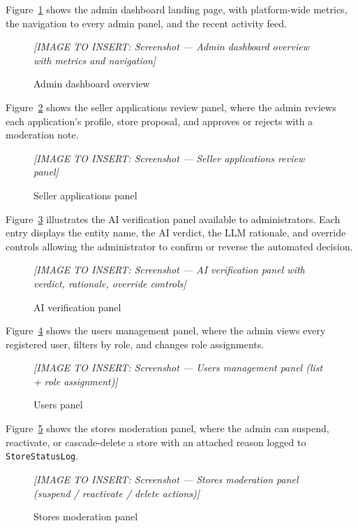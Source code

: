 \documentclass[12pt, a4paper, oneside]{report}
\newcommand{\imagePlaceholder}[2][8cm]{%
  \begin{mdframed}[backgroundcolor=cheebolightgray,linecolor=gray!40]
    \centering
    \vspace{#1}
    \textit{\color{gray}[IMAGE TO INSERT: #2]}
    \vspace{8mm}
  \end{mdframed}
}
\begin{document}
Figure~\ref{fig:admin-overview} shows the admin dashboard landing
page, with platform-wide metrics, the navigation to every admin
panel, and the recent activity feed.

\begin{figure}[H]
  \centering
  \imagePlaceholder[8cm]{Screenshot — Admin dashboard overview with metrics and navigation}
  \caption{Admin dashboard overview}
  \label{fig:admin-overview}
\end{figure}

Figure~\ref{fig:seller-apps} shows the seller applications review
panel, where the admin reviews each application's profile, store
proposal, and approves or rejects with a moderation note.

\begin{figure}[H]
  \centering
  \imagePlaceholder[8cm]{Screenshot — Seller applications review panel}
  \caption{Seller applications panel}
  \label{fig:seller-apps}
\end{figure}

Figure~\ref{fig:ai-panel} illustrates the AI verification panel
available to administrators. Each entry displays the entity name,
the AI verdict, the LLM rationale, and override controls allowing
the administrator to confirm or reverse the automated decision.

\begin{figure}[H]
  \centering
  \imagePlaceholder[8cm]{Screenshot — AI verification panel with verdict, rationale, override controls}
  \caption{AI verification panel}
  \label{fig:ai-panel}
\end{figure}

Figure~\ref{fig:users-panel} shows the users management panel,
where the admin views every registered user, filters by role, and
changes role assignments.

\begin{figure}[H]
  \centering
  \imagePlaceholder[8cm]{Screenshot — Users management panel (list + role assignment)}
  \caption{Users panel}
  \label{fig:users-panel}
\end{figure}

Figure~\ref{fig:stores-mod} shows the stores moderation panel,
where the admin can suspend, reactivate, or cascade-delete a store
with an attached reason logged to \texttt{StoreStatusLog}.

\begin{figure}[H]
  \centering
  \imagePlaceholder[8cm]{Screenshot — Stores moderation panel (suspend / reactivate / delete actions)}
  \caption{Stores moderation panel}
  \label{fig:stores-mod}
\end{figure}
\end{document}

